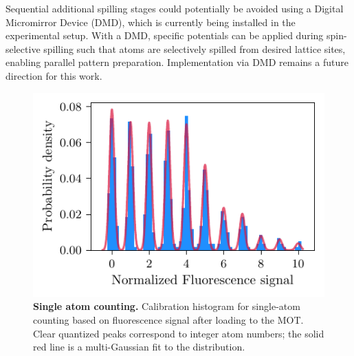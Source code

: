 Sequential additional spilling stages could potentially be avoided using a Digital Micromirror Device (DMD), which is currently being installed in the experimental setup. With a DMD, specific potentials can be applied during spin-selective spilling such that atoms are selectively spilled from desired lattice sites, enabling parallel pattern preparation. Implementation via DMD remains a future direction for this work.

\begin{figure}
    \centering
    \includegraphics{fig-py/atom-counting.pdf}
    \caption[Single atom counting]{
        \textbf{Single atom counting.}
        Calibration histogram for single-atom counting based on fluorescence signal after loading to the MOT. Clear quantized peaks correspond to integer atom numbers; the solid red line is a multi-Gaussian fit to the distribution. 
    }
    \label{fig:spillingadd}
\end{figure}